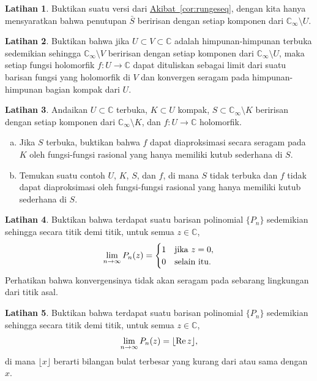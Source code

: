 \documentclass[12pt,openany]{book}
\newcommand{\avoidbreak}{\postdisplaypenalty=100}
\renewcommand{\Re}{\operatorname{Re}}
\newcommand{\C}{{\mathbb{C}}}
\theoremstyle{plain}
\theoremstyle{remark}
\theoremstyle{definition}
\newenvironment{exbox}{%
    \def\FrameCommand{\vrule width 1pt \relax\hspace{10pt}}%
    \MakeFramed{\advance\hsize-\width\FrameRestore}%
}{%
    \endMakeFramed
}
\newenvironment{exparts}{%
    \leavevmode\begin{enumerate}[a),noitemsep,topsep=0pt,parsep=0pt,partopsep=0pt]
}{%
    \end{enumerate}
}
\theoremstyle{exercise}
\newtheorem{exercise}{Latihan}[section]
\theoremstyle{example}
\newcommand{\corref}[1]{\hyperref[#1]{Akibat~\ref*{#1}}}
\begin{document}
\begin{exbox}
\begin{exercise}
Buktikan suatu versi dari \corref{cor:rungeseq}, dengan kita hanya mensyaratkan bahwa
penutupan $\bar{S}$ beririsan dengan setiap komponen dari $\C_\infty \setminus U$.
\end{exercise}

\begin{exercise}
Buktikan bahwa jika $U \subset V \subset \C$ adalah himpunan-himpunan terbuka sedemikian sehingga
$\C_\infty \setminus V$ beririsan dengan setiap komponen dari
$\C_\infty \setminus U$, maka setiap fungsi holomorfik $f \colon U \to \C$
dapat dituliskan sebagai limit dari suatu barisan fungsi yang holomorfik di $V$
dan konvergen seragam pada himpunan-himpunan bagian kompak dari $U$.
\end{exercise}

\begin{exercise}
Andaikan $U \subset \C$ terbuka, $K \subset U$ kompak, $S \subset
\C_\infty \setminus K$ beririsan dengan setiap komponen dari $\C_\infty \setminus K$,
dan $f \colon U \to \C$ holomorfik.
\begin{exparts}
\item
Jika $S$ terbuka,
buktikan bahwa $f$ dapat diaproksimasi secara seragam pada $K$ oleh fungsi-fungsi rasional
yang hanya memiliki kutub sederhana di $S$.
\item
Temukan suatu contoh $U$, $K$, $S$, dan $f$, di mana $S$ tidak terbuka dan
$f$ tidak dapat diaproksimasi oleh fungsi-fungsi rasional yang hanya memiliki kutub sederhana
di $S$.
\end{exparts}
\end{exercise}

\begin{exercise}
Buktikan bahwa terdapat suatu barisan polinomial $\{ P_n \}$ sedemikian sehingga
secara titik demi titik,
untuk semua $z \in \C$,
\begin{equation*}
\lim_{n \to \infty}
P_n(z) =
\begin{cases}
1 & \text{jika } z = 0, \\
0 & \text{selain itu.}
\end{cases}
\avoidbreak
\end{equation*}
Perhatikan bahwa konvergensinya tidak akan seragam pada sebarang lingkungan dari
titik asal.
\end{exercise}

\begin{exercise}
Buktikan bahwa terdapat suatu barisan polinomial $\{ P_n \}$ sedemikian sehingga
secara titik demi titik,
untuk semua $z \in \C$,
\begin{equation*}
\lim_{n \to \infty}
P_n(z) = \lfloor \Re z \rfloor ,
\avoidbreak
\end{equation*}
di mana $\lfloor x \rfloor$ berarti bilangan bulat terbesar yang kurang dari atau sama dengan
$x$. 
\end{exercise}


\end{exbox}
\end{document}
